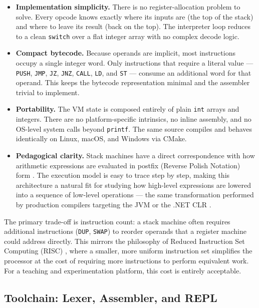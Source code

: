 \begin{itemize}
    \item \textbf{Implementation simplicity.} There is no register-allocation problem to solve. Every opcode knows exactly where its inputs are (the top of the stack) and where to leave its result (back on the top). The interpreter loop reduces to a clean \texttt{switch} over a flat integer array with no complex decode logic.
    \item \textbf{Compact bytecode.} Because operands are implicit, most instructions occupy a single integer word. Only instructions that require a literal value — \texttt{PUSH}, \texttt{JMP}, \texttt{JZ}, \texttt{JNZ}, \texttt{CALL}, \texttt{LD}, and \texttt{ST} — consume an additional word for that operand. This keeps the bytecode representation minimal and the assembler trivial to implement.
    \item \textbf{Portability.} The VM state is composed entirely of plain \texttt{int} arrays and integers. There are no platform-specific intrinsics, no inline assembly, and no OS-level system calls beyond \texttt{printf}. The same source compiles and behaves identically on Linux, macOS, and Windows via CMake.
    \item \textbf{Pedagogical clarity.} Stack machines have a direct correspondence with how arithmetic expressions are evaluated in postfix (Reverse Polish Notation) form \cite{RPN}. The execution model is easy to trace step by step, making this architecture a natural fit for studying how high-level expressions are lowered into a sequence of low-level operations — the same transformation performed by production compilers targeting the JVM \cite{JVMSpec} or the .NET CLR \cite{CLRSpec}.
\end{itemize}

The primary trade-off is instruction count: a stack machine often requires additional instructions (\texttt{DUP}, \texttt{SWAP}) to reorder operands that a register machine could address directly. This mirrors the philosophy of Reduced Instruction Set Computing (RISC) \cite{RISC}, where a smaller, more uniform instruction set simplifies the processor at the cost of requiring more instructions to perform equivalent work. For a teaching and experimentation platform, this cost is entirely acceptable.

\subsection*{Toolchain: Lexer, Assembler, and REPL}

